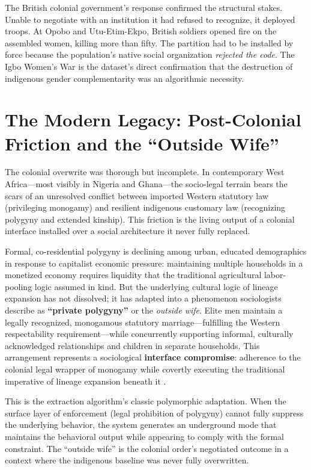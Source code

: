 The British colonial government's response confirmed the structural stakes. Unable to negotiate with an institution it had refused to recognize, it deployed troops. At Opobo and Utu-Etim-Ekpo, British soldiers opened fire on the assembled women, killing more than fifty. The partition had to be installed by force because the population's native social organization \textit{rejected the code}. The Igbo Women's War is the dataset's direct confirmation that the destruction of indigenous gender complementarity was an algorithmic necessity.

\section{The Modern Legacy: Post-Colonial Friction and the ``Outside Wife''}
\label{sec:outside_wife}

The colonial overwrite was thorough but incomplete. In contemporary West Africa---most visibly in Nigeria and Ghana---the socio-legal terrain bears the scars of an unresolved conflict between imported Western statutory law (privileging monogamy) and resilient indigenous customary law (recognizing polygyny and extended kinship). This friction is the living output of a colonial interface installed over a social architecture it never fully replaced.

Formal, co-residential polygyny is declining among urban, educated demographics in response to capitalist economic pressure: maintaining multiple households in a monetized economy requires liquidity that the traditional agricultural labor-pooling logic assumed in kind. But the underlying cultural logic of lineage expansion has not dissolved; it has adapted into a phenomenon sociologists describe as \textbf{``private polygyny''} or the \textit{outside wife}. Elite men maintain a legally recognized, monogamous statutory marriage---fulfilling the Western respectability requirement---while concurrently supporting informal, culturally acknowledged relationships and children in separate households. This arrangement represents a sociological \textbf{interface compromise}: adherence to the colonial legal wrapper of monogamy while covertly executing the traditional imperative of lineage expansion beneath it \cite{colonial_polygamy_pmc}.

This is the extraction algorithm's classic polymorphic adaptation. When the surface layer of enforcement (legal prohibition of polygyny) cannot fully suppress the underlying behavior, the system generates an underground mode that maintains the behavioral output while appearing to comply with the formal constraint. The ``outside wife'' is the colonial order's negotiated outcome in a context where the indigenous baseline was never fully overwritten.

